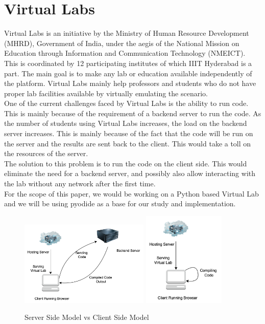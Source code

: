 \section{Virtual Labs}
Virtual Labs is an initiative by the Ministry of Human Resource Development (MHRD), Government of India, under the aegis of the National Mission on Education through Information and Communication Technology (NMEICT). This is coordinated by 12 participating institutes of which IIIT Hyderabad is a part. The main goal is to make any lab or education available independently of the platform. Virtual Labs mainly help professors and students who do not have proper lab facilities available by virtually emulating the scenario. \\
One of the current challenges faced by Virtual Labs is the ability to run code. This is mainly because of the requirement of a backend server to run the code. As the number of students using Virtual Labs increases, the load on the backend server increases. This is mainly because of the fact that the code will be run on the server and the results are sent back to the client. This would take a toll on the resources of the server. \\
The solution to this problem is to run the code on the client side. This would eliminate the need for a backend server, and possibly also allow interacting with the lab without any network after the first time. \\
For the scope of this paper, we would be working on a Python based Virtual Lab and we will be using pyodide as a base for our study and implementation. \\

\begin{figure}
    \centering
        {\includegraphics[width=0.55\textwidth]{images/server-model.png}}
        {\includegraphics[width=0.35\textwidth]{images/client-model.png}}
    \caption{Server Side Model vs Client Side Model}
    \label{fig:csr vs ssr}
\end{figure}
